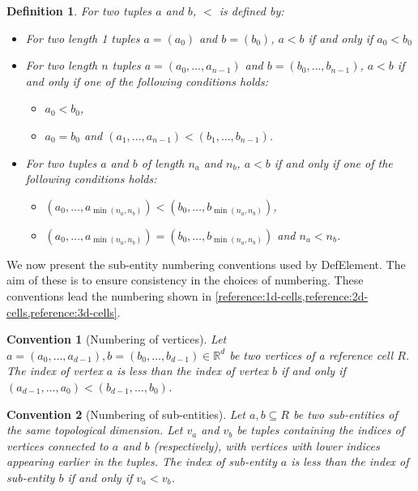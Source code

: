 \documentclass[sn-mathphys-num]{sn-jnl}%
\theoremstyle{thmstyleone}%
\newtheorem{convention}{Convention}%
\newcommand{\refel}{R}
\theoremstyle{thmstyletwo}%
\theoremstyle{thmstylethree}%
\newtheorem{definition}{Definition}%
\begin{document}
\begin{definition}
For two tuples $a$ and $b$, $<$ is defined by:
\begin{itemize}
\item For two length 1 tuples $a=(a_0)$ and $b=(b_0)$,
$a<b$ if and only if
$a_0<b_0$
\item For two length $n$ tuples $a=(a_0,\dots,a_{n-1})$ and $b=(b_0,\dots,b_{n-1})$,
$a<b$ if and only if one of the following conditions holds:
\begin{itemize}
\item $a_0<b_0$,
\item $a_0=b_0$ and $(a_1,\dots,a_{n-1}) < (b_1,\dots,b_{n-1})$.
\end{itemize}
\item For two tuples $a$ and $b$ of length $n_a$ and $n_b$,
$a<b$ if and only if one of the following conditions holds:
\begin{itemize}
\item $(a_0,\dots,a_{\min(n_a, n_b)})<(b_0,\dots,b_{\min(n_a, n_b)})$,
\item $(a_0,\dots,a_{\min(n_a, n_b)})=(b_0,\dots,b_{\min(n_a, n_b)})$ and $n_a < n_b$.
\end{itemize}
\end{itemize}
\end{definition}

We now present the sub-entity numbering conventions used by DefElement. The aim of these is to
ensure consistency in the choices of numbering. These conventions lead the numbering
shown in \cref{reference:1d-cells,reference:2d-cells,reference:3d-cells}.

\begin{convention}[Numbering of vertices]\label{c:vertices}
Let $a=(a_0,\dots,a_{d-1}), b=(b_0,\dots,b_{d-1})\in\mathbb{R}^{d}$ be two vertices of a reference
cell $\refel$. The index of vertex $a$ is less than the index of vertex $b$ if and only if
$(a_{d-1},\dots,a_0)<(b_{d-1},\dots,b_0)$.
\end{convention}

\begin{convention}[Numbering of sub-entities]\label{c:sub-entities}
Let $a, b\subseteq\refel$ be two sub-entities of the same topological dimension.
Let $v_a$ and $v_b$ be tuples containing the indices of vertices connected to $a$ and $b$
(respectively), with vertices with lower indices appearing earlier in the tuples.
The index of sub-entity $a$ is less than the index of sub-entity $b$ if and only if
$v_a < v_b$.
\end{convention}
\end{document}
